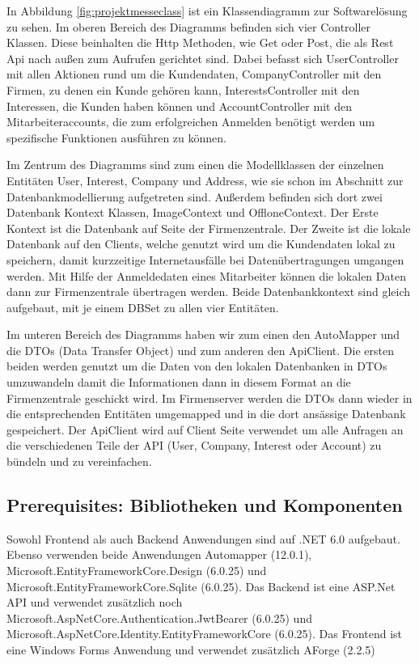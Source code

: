 In Abbildung \ref{fig:projektmesseclass} ist ein Klassendiagramm zur Softwarelösung zu sehen. Im oberen Bereich des Diagramms befinden sich vier Controller Klassen. Diese beinhalten die Http Methoden, wie Get oder Post, die als Rest Api nach außen zum Aufrufen gerichtet sind. Dabei befasst sich UserController mit allen Aktionen rund um die Kundendaten, CompanyController mit den Firmen, zu denen ein Kunde gehören kann, InterestsController mit den Interessen, die Kunden haben können und AccountController mit den Mitarbeiteraccounts, die zum erfolgreichen Anmelden benötigt werden um spezifische Funktionen ausführen zu können.

Im Zentrum des Diagramms sind zum einen die Modellklassen der einzelnen Entitäten User, Interest, Company und Address, wie sie schon im Abschnitt zur Datenbankmodellierung aufgetreten sind. Außerdem befinden sich dort zwei Datenbank Kontext Klassen, ImageContext und OffloneContext. Der Erste Kontext ist die Datenbank auf Seite der Firmenzentrale. Der Zweite ist die lokale Datenbank auf den Clients, welche genutzt wird um die Kundendaten lokal zu speichern, damit kurzzeitige Internetausfälle bei Datenübertragungen umgangen werden. Mit Hilfe der Anmeldedaten eines Mitarbeiter können die lokalen Daten dann zur Firmenzentrale übertragen werden. Beide Datenbankkontext sind gleich aufgebaut, mit je einem DBSet zu allen vier Entitäten.

Im unteren Bereich des Diagramms haben wir zum einen den AutoMapper und die DTOs (Data Transfer Object) und zum anderen den ApiClient. Die ersten beiden werden genutzt um die Daten von den lokalen Datenbanken in DTOs umzuwandeln damit die Informationen dann in diesem Format an die Firmenzentrale geschickt wird. Im Firmenserver werden die DTOs dann wieder in die entsprechenden Entitäten umgemapped und in die dort ansässige Datenbank gespeichert. Der ApiClient wird auf Client Seite verwendet um alle Anfragen an die verschiedenen Teile der API (User, Company, Interest oder Account) zu bündeln und zu vereinfachen.

\subsection{Prerequisites: Bibliotheken und Komponenten}
Sowohl Frontend als auch Backend Anwendungen sind auf .NET 6.0 aufgebaut. Ebenso verwenden beide Anwendungen Automapper (12.0.1), \\ Microsoft.EntityFrameworkCore.Design (6.0.25) und \\ Microsoft.EntityFrameworkCore.Sqlite (6.0.25). Das Backend ist eine ASP.Net API und verwendet zusätzlich noch Microsoft.AspNetCore.Authentication.JwtBearer (6.0.25) und Microsoft.AspNetCore.Identity.EntityFrameworkCore (6.0.25). Das Frontend ist eine Windows Forms Anwendung und verwendet zusätzlich AForge (2.2.5)

